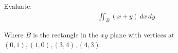 Evaluate: 
    \begin{align*}
        \iint_B (x+y) \, dx \, dy
    \end{align*}
    
Where $B$ is the rectangle in the $xy$ plane with vertices at $(0,1),(1,0),(3,4),(4,3)$.
